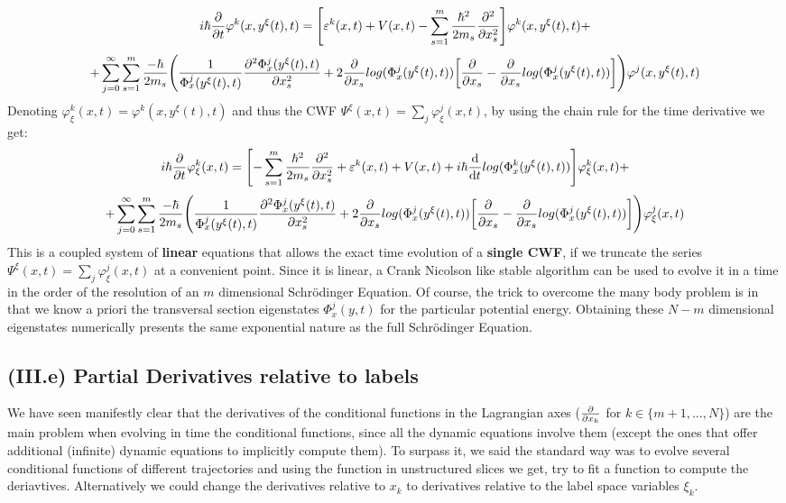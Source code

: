 \documentclass[11pt, a4paper]{article} %
\begin{document}
\begin{equation}
 i\hbar\pdv{}{t}\varphi^k(x,y^\xi(t),t)=\qty[ \varepsilon^k(x,t)+V(x,t)  -\sum_{s=1}^m\frac{\hbar^2}{2m_s}\pdv[2]{}{x_s} ]\varphi^k(x,y^\xi(t),t)+
\end{equation}
$$
+\sum_{j=0}^\infty\sum_{s=1}^m \frac{-\hbar}{2m_s}\qty( \frac{1}{\Phi^j_x(y^\xi(t),t)}\pdv[2]{\Phi^j_x(y^\xi(t),t)}{x_s}+2\pdv{}{x_s}log(\Phi^j_x(y^\xi(t),t))\qty[\pdv{}{x_s}-\pdv{}{x_s}log(\Phi^j_x(y^\xi(t),t))] )\varphi^j(x,y^\xi(t),t)
$$
Denoting $\varphi^k_\xi(x,t)=\varphi^k(x,y^\xi(t),t)$ and thus the CWF $\Psi^\xi(x,t)=\sum_j \varphi^j_\xi(x,t)$, by using the chain rule for the time derivative we get:
\begin{equation}\label{XabEq3}
 i\hbar\pdv{}{t}\varphi^k_\xi(x,t)=\qty[-\sum_{s=1}^m\frac{\hbar^2}{2m_s}\pdv[2]{}{x_s}+ \varepsilon^k(x,t)+V(x,t)   +i\hbar \dv{}{t}log(\Phi^k_x(y^\xi(t),t))]\varphi^k_\xi(x,t)+
\end{equation}
$$
+\sum_{j=0}^\infty\sum_{s=1}^m \frac{-\hbar}{2m_s}\qty( \frac{1}{\Phi^j_x(y^\xi(t),t)}\pdv[2]{\Phi^j_x(y^\xi(t),t)}{x_s}+2\pdv{}{x_s}log(\Phi^j_x(y^\xi(t),t))\qty[\pdv{}{x_s}-\pdv{}{x_s}log(\Phi^j_x(y^\xi(t),t))] )\varphi^j_\xi(x,t)
$$
This is a coupled system of {\bf linear} equations that allows the exact time evolution of a {\bf single CWF}, if we truncate the series $\Psi^\xi(x,t)=\sum_j \varphi^j_\xi(x,t)$ at a convenient point. Since it is linear, a Crank Nicolson like stable algorithm can be used to evolve it in a time in the order of the resolution of an $m$ dimensional Schrödinger Equation. Of course, the trick to overcome the many body problem is in that we know a priori the transversal section eigenstates $\Phi^j_x(y,t)$ for the particular potential energy. Obtaining these $N-m$ dimensional eigenstates numerically presents the same exponential nature as the full Schrödinger Equation.


\subsection*{(III.e) Partial Derivatives relative to labels}
We have seen manifestly clear that the derivatives of the conditional functions in the Lagrangian axes ($\pdv{}{x_k}$ for $k\in\{m+1,...,N \}$) are the main problem when evolving in time the conditional functions, since all the dynamic equations involve them (except the ones that offer additional (infinite) dynamic equations to implicitly compute them). To surpass it, we said the standard way was to evolve several conditional functions of different trajectories and using the function in unstructured slices we get, try to fit a function to compute the deriavtives. Alternatively we could change the derivatives relative to $x_k$ to derivatives relative to the label space variables $\xi_k$.
\end{document}
